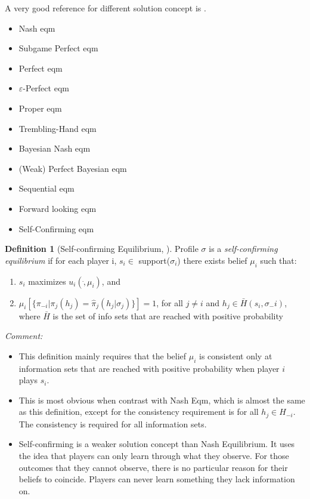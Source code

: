\documentclass{book}
\theoremstyle{plain}
\theoremstyle{definition}
\newtheorem{defn}{Definition}[section] %
\begin{document}
A very good reference for different solution concept is \cite{vanDamme:1987}.
\begin{itemize}
	\item Nash eqm
	\item Subgame Perfect eqm
	\item Perfect eqm
	\item $\varepsilon$-Perfect eqm
	\item Proper eqm
	\item Trembling-Hand eqm
	\item Bayesian Nash eqm
	\item (Weak) Perfect Bayesian eqm
	\item Sequential eqm
	\item Forward looking eqm
	\item Self-Confirming eqm

\end{itemize}


\begin{defn}[Self-confirming Equilibrium, \cite{Fudenberg_Levine:93EMCAa}]
Profile $\sigma$ is a \textit{self-confirming equilibrium} if for each player i, $s_i \in$ support($\sigma_i$) there exists belief $\mu_i$ such that:
\begin{enumerate}
	\item $s_i$ maximizes $u_i(\dot,\mu_i)$, and
	\item $\mu_i[\{\pi_{-i}|\pi_j(h_j)=
	\hat \pi_j(h_j|\sigma_j)\}]=1$, for all $j \neq i$ and $h_j \in \bar H(s_i,\sigma_-i)$, where $\bar H$ is the set of info sets that are reached with positive probability
\end{enumerate}
\end{defn}

\begin{singlespacing}
\noindent
\textit{Comment:}
\end{singlespacing}
\begin{itemize}
	\setlength{\itemsep}{0pt}
	\item This definition mainly requires that the belief $\mu_i$ is consistent only at information sets that are reached with positive probability when player $i$ plays $s_i$.
	\item This is most obvious when contrast with Nash Eqm, which is almost the same as this definition,
	except for the consistency requirement is for all $h_j \in H_{-i}$. The consistency is required  for all information sets.
	\item Self-confirming is a weaker solution concept than Nash Equilibrium. 
	It uses the idea that players can only learn through what they observe.
	For those outcomes that they cannot observe,
	there is no particular reason for their beliefs to coincide.
	Players can never learn something they lack information on.
\end{itemize}
\end{document}

